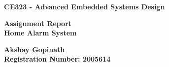 \documentclass[aps, secnumarabic, balancelastpage, asmath, amssymb, nofootinbib, floatfix,]{revtex4-2}
\begin{document}
    \begin{titlepage}
   \begin{center}
       \vspace*{1cm}

	\Huge
       \textbf{CE323 - Advanced Embedded Systems Design}

       \vspace{0.5cm}

       \LARGE
        \textbf{Assignment Report\\Home Alarm System}

       \vspace{1.5cm}

       \textbf{Akshay Gopinath}\\
       \textbf{Registration Number: 2005614}

   \end{center}
   \tableofcontents
   \listoffigures


\end{titlepage}














\clearpage
\end{document}
